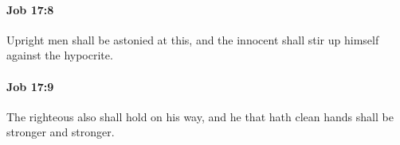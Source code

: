 		\paragraph{Job 17:8} %
			\label{JOB-17-8}

			Upright men shall be astonied at this, and the innocent shall stir up himself against the hypocrite.


		\paragraph{Job 17:9} %
			\label{JOB-17-9}

			The righteous also shall hold on his way, and he that hath clean hands shall be stronger and stronger.


